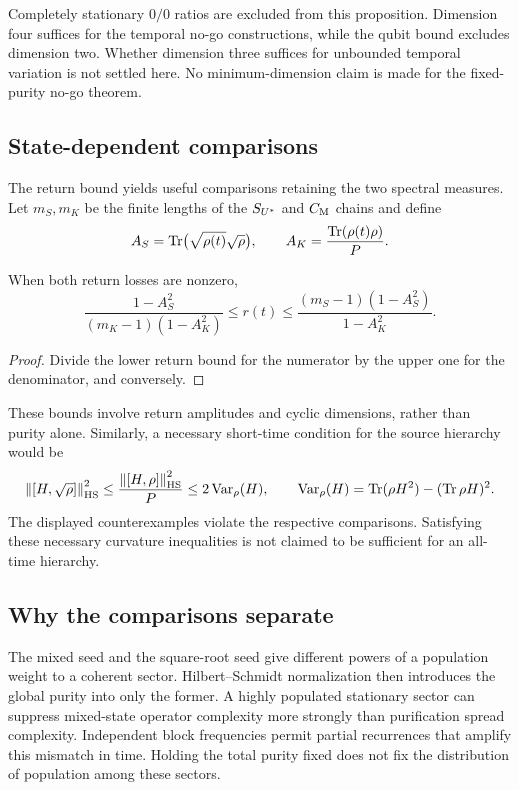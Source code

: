 Completely stationary $0/0$ ratios are excluded from this proposition.
Dimension four suffices for the temporal no-go constructions, while the
qubit bound excludes dimension two. Whether dimension three suffices for
unbounded temporal variation is not settled here. No minimum-dimension
claim is made for the fixed-purity no-go theorem.

\subsection{State-dependent comparisons}
The return bound yields useful comparisons retaining the two spectral
measures. Let $m_S,m_K$ be the finite lengths of the $S_{U^*}$ and $C_{\mathrm M}$
chains and define
\begin{equation}\label{eq:returns}
 A_S=\operatorname{Tr}\bigl(\sqrt{\rho(t)}\sqrt\rho\bigr),\qquad
 A_K=\frac{\operatorname{Tr}(\rho(t)\rho)}P.
\end{equation}
\begin{corollary}\label{cor:return-comparison}
When both return losses are nonzero,
\begin{equation}\label{eq:state-dependent}
 \frac{1-A_S^2}{(m_K-1)(1-A_K^2)}
 \le r(t)\le
 \frac{(m_S-1)(1-A_S^2)}{1-A_K^2}.
\end{equation}
\end{corollary}
\begin{proof}
Divide the lower return bound for the numerator by the upper one for
the denominator, and conversely.
\end{proof}

These bounds involve return amplitudes and cyclic dimensions, rather
than purity alone. Similarly, a necessary short-time condition for the
source hierarchy would be
\begin{equation}\label{eq:curvature-necessary}
 \left\lVert [H,\sqrt\rho]\right\rVert_{\mathrm{HS}}^2
 \le\frac{\left\lVert [H,\rho]\right\rVert_{\mathrm{HS}}^2}{P}
 \le2\operatorname{Var}_\rho(H),\qquad
 \operatorname{Var}_\rho(H)=\operatorname{Tr}(\rho H^2)-(\operatorname{Tr}\rho H)^2.
\end{equation}
The displayed counterexamples violate the respective comparisons.
Satisfying these necessary curvature inequalities is not claimed to be
sufficient for an all-time hierarchy.

\subsection{Why the comparisons separate}
The mixed seed and the square-root seed give different powers of a
population weight to a coherent sector. Hilbert--Schmidt normalization
then introduces the global purity into only the former. A highly populated
stationary sector can suppress mixed-state operator complexity more strongly
than purification spread complexity. Independent block frequencies permit
partial recurrences that amplify this mismatch in time. Holding the total
purity fixed does not fix the distribution of population among these sectors.

